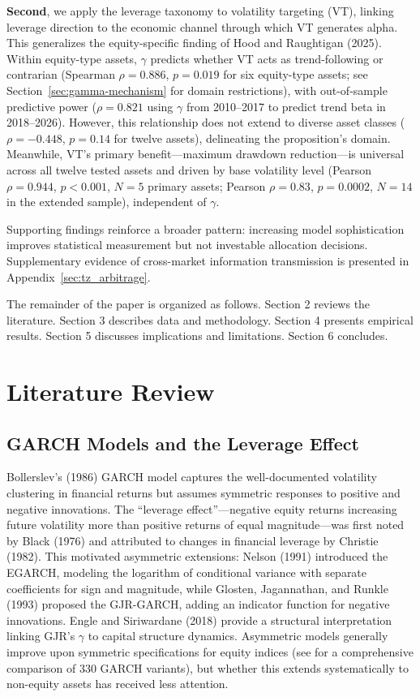 \textbf{Second}, we apply the leverage taxonomy to volatility targeting (VT), linking leverage direction to the economic channel through which VT generates alpha. This generalizes the equity-specific finding of Hood and Raughtigan (2025). Within equity-type assets, $\gamma$ predicts whether VT acts as trend-following or contrarian (Spearman $\rho = 0.886$, $p = 0.019$ for six equity-type assets; see Section~\ref{sec:gamma-mechanism} for domain restrictions), with out-of-sample predictive power ($\rho = 0.821$ using $\gamma$ from 2010--2017 to predict trend beta in 2018--2026). However, this relationship does not extend to diverse asset classes ($\rho = -0.448$, $p = 0.14$ for twelve assets), delineating the proposition's domain. Meanwhile, VT's primary benefit---maximum drawdown reduction---is universal across all twelve tested assets and driven by base volatility level (Pearson $\rho = 0.944$, $p < 0.001$, $N = 5$ primary assets; Pearson $\rho = 0.83$, $p = 0.0002$, $N = 14$ in the extended sample), independent of $\gamma$. %

Supporting findings reinforce a broader pattern: increasing model sophistication improves statistical measurement but not investable allocation decisions. Supplementary evidence of cross-market information transmission is presented in Appendix~\ref{sec:tz_arbitrage}.

The remainder of the paper is organized as follows. Section 2 reviews the literature. Section 3 describes data and methodology. Section 4 presents empirical results. Section 5 discusses implications and limitations. Section 6 concludes.



\section{Literature Review}

\subsection{GARCH Models and the Leverage Effect}

Bollerslev's (1986) GARCH model captures the well-documented volatility clustering in financial returns but assumes symmetric responses to positive and negative innovations. The ``leverage effect''---negative equity returns increasing future volatility more than positive returns of equal magnitude---was first noted by Black (1976) and attributed to changes in financial leverage by Christie (1982). This motivated asymmetric extensions: Nelson (1991) introduced the EGARCH, modeling the logarithm of conditional variance with separate coefficients for sign and magnitude, while Glosten, Jagannathan, and Runkle (1993) proposed the GJR-GARCH, adding an indicator function for negative innovations. Engle and Siriwardane (2018) provide a structural interpretation linking GJR's $\gamma$ to capital structure dynamics. Asymmetric models generally improve upon symmetric specifications for equity indices (see \citealt{hansen2005} for a comprehensive comparison of 330 GARCH variants), but whether this extends systematically to non-equity assets has received less attention.

